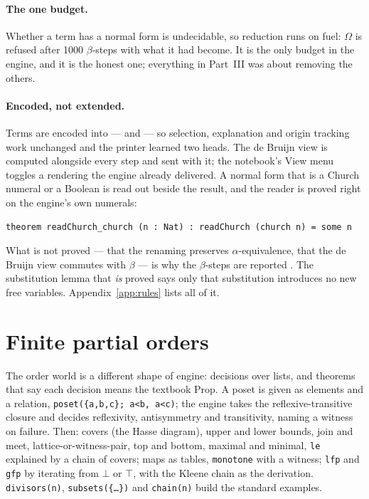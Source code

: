 \paragraph{The one budget.} Whether a term has a normal form is undecidable, so reduction runs on
fuel: $\Omega$ is refused after 1000 $\beta$-steps with what it had become. It is the only budget
in the engine, and it is the honest one; everything in Part~III was about removing the others.

\paragraph{Encoded, not extended.} Terms are encoded into  --- 
and  --- so selection, explanation and origin tracking work unchanged and the
printer learned two heads. The de Bruijn view is computed alongside every step and sent with it;
the notebook's View menu toggles a rendering the engine already delivered. A normal form that is a
Church numeral or a Boolean is read out beside the result, and the reader is proved right on the
engine's own numerals:

\begin{verbatim}
theorem readChurch_church (n : Nat) : readChurch (church n) = some n
\end{verbatim}

What is not proved --- that the renaming preserves $\alpha$-equivalence, that the de Bruijn view
commutes with $\beta$ --- is why the $\beta$-steps are reported . The
substitution lemma that \emph{is} proved says only that substitution introduces no new free
variables. Appendix~\ref{app:rules} lists all of it.

\section{Finite partial orders}

The order world is a different shape of engine: decisions over lists, and theorems that say each
decision means the textbook Prop. A poset is given as elements and a relation,
\texttt{poset(\{a,b,c\}; a<b, a<c)}; the engine takes the reflexive-transitive closure and decides
reflexivity, antisymmetry and transitivity, naming a witness on failure. Then: covers (the Hasse
diagram), upper and lower bounds, join and meet, lattice-or-witness-pair, top and bottom, maximal
and minimal, \texttt{le} explained by a chain of covers; maps as tables, \texttt{monotone} with a
witness; \texttt{lfp} and \texttt{gfp} by iterating from $\bot$ or $\top$, with the Kleene chain as
the derivation. \texttt{divisors(n)}, \texttt{subsets(\{…\})} and \texttt{chain(n)} build the
standard examples.


